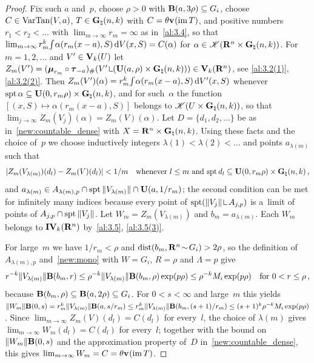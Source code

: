 \begin{proof}
    Fix such $a$ and~$p$, choose $\rho > 0$ with $\mathbf{B}(a,3\rho) \subseteq G_i$, choose $C \in
    \operatorname{VarTan}(V,a)$, $T \in \mathbf{G}_{\natural}(n,k)$ with $C = \theta \mathbf{v}_{}(\operatorname{im} T)$, and positive
    numbers $r_1 < r_2 < \ldots$ with $\lim_{m \to \infty} r_m = \infty$ as in~\ref{al:3.4},
    so that $\lim_{m \to \infty} r_m^{k} {\textstyle\int_{}^{}} \alpha(r_m(x - a), S) \,\mathrm{d} V(x,S) =
    C(\alpha)$ for $\alpha \in \mathscr{K}(\mathbf{R}^{n} \times \mathbf{G}_{\natural}(n,k))$. For $m = 1, 2,
    \ldots$ and $V' \in \mathbf{V}_{k}(U)$ let $Z_m(V') = (\scale{r_m} \circ \trans{-a})_\# (V'
    \restrict (\oball{a}{\rho} \times \pgrass{\adim}{\vdim})) \in \Var{\vdim}(\R^{\adim})$, see
    \ref{al:3.2(1)}, \ref{al:3.2(2)}. Then $Z_m(V')(\alpha) = r_m^{k} {\textstyle\int_{}^{}}
    \alpha(r_m(x-a), S) \,\mathrm{d} V'(x,S)$ whenever $\operatorname{spt} \alpha \subseteq \mathbf{U}(0,r_m \rho) \times
    \mathbf{G}_{\natural}(n,k)$, and for such~$\alpha$ the function $[(x,S) \mapsto \alpha(r_m(x-a),
    S)]$ belongs to $\mathscr{K}(U \times \mathbf{G}_{\natural}(n,k))$, so that $\lim_{j \to \infty}
    Z_m(V_j)(\alpha) = Z_m(V)(\alpha)$. Let $D = \{ d_1, d_2, \ldots \}$ be as
    in~\ref{new:countable_dense} with $X = \mathbf{R}^{n} \times \mathbf{G}_{\natural}(n,k)$. Using these
    facts and the choice of~$p$ we choose inductively integers $\lambda(1) < \lambda(2) < \ldots$
    and points $a_{\lambda(m)}$ such that
    \begin{displaymath}
        |Z_m(V_{\lambda(m)})(d_l) - Z_m(V)(d_l)| < 1/m \quad \text{whenever $l \le m$ and $\operatorname{spt} d_l
        \subseteq \mathbf{U}(0,r_m \rho) \times \mathbf{G}_{\natural}(n,k)$} \,,
    \end{displaymath}
    and $a_{\lambda(m)} \in A_{\lambda(m),p} \cap \operatorname{spt} \|V_{\lambda(m)}\| \cap \mathbf{U}(a,1/r_m)$;
    the second condition can be met for infinitely many indices because every point of $\spt
    (\|V_j\| \restrict A_{j,p})$ is a~limit of points of $A_{j,p} \cap \operatorname{spt} \|V_j\|$. Let $W_m =
    Z_m(V_{\lambda(m)})$ and $b_m = a_{\lambda(m)}$. Each $W_m$ belongs to
    $\mathbf{IV}_{k}(\mathbf{R}^{n})$ by~\ref{al:3.5}, \ref{al:3.5(3)}.

    For large~$m$ we have $1/r_m < \rho$ and $\operatorname{dist}(b_m, \mathbf{R}^{n} \!\sim\! G_i) > 2 \rho$, so
    the definition of $A_{\lambda(m),p}$ and~\ref{new:mono} with $W = G_i$, $R = \rho$ and $\Lambda
    = p$ give
    \begin{displaymath}
        r^{-k} \|V_{\lambda(m)}\| \mathbf{B}(b_m,r) \le \rho^{-k} \|V_{\lambda(m)}\|
        \mathbf{B}(b_m,\rho) \exp(p \rho) \le \rho^{-k} M_i \exp(p\rho) \quad \text{for $0 < r \le
        \rho$} \,,
    \end{displaymath}
    because $\mathbf{B}(b_m,\rho) \subseteq \mathbf{B}(a,2\rho) \subseteq G_i$. For $0 < s < \infty$
    and large~$m$ this yields $\|W_m\| \mathbf{B}(0,s) = r_m^{k} \|V_{\lambda(m)}\|
    \mathbf{B}(a,s/r_m) \le r_m^{k} \|V_{\lambda(m)}\| \mathbf{B}(b_m,(s+1)/r_m) \le (s+1)^{k}
    \rho^{-k} M_i \exp(p\rho)$. Since $\lim_{m \to \infty} Z_m(V)(d_l) = C(d_l)$ for
    every~$l$, the choice of $\lambda(m)$ gives $\lim_{m \to \infty} W_m(d_l) = C(d_l)$ for
    every~$l$; together with the bound on $\|W_m\| \mathbf{B}(0,s)$ and the approximation property
    of~$D$ in~\ref{new:countable_dense}, this gives $\lim_{m \to \infty} W_m = C = \theta
    \mathbf{v}_{}(\operatorname{im} T)$.


\end{proof}
